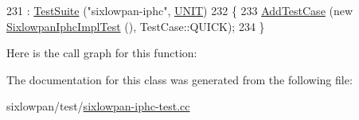 \begin{DoxyCode}
231   : \hyperlink{classns3_1_1TestSuite_a904b0c40583b744d30908aeb94636d1a}{TestSuite} (\textcolor{stringliteral}{"sixlowpan-iphc"}, \hyperlink{classns3_1_1TestSuite_a1ebfcab34ec8161e085e8e3a1855eae0a3885375a3787abf60431f8454b3cadbd}{UNIT})
232 \{
233   \hyperlink{classns3_1_1TestCase_a3718088e3eefd5d6454569d2e0ddd835}{AddTestCase} (\textcolor{keyword}{new} \hyperlink{classSixlowpanIphcImplTest}{SixlowpanIphcImplTest} (), TestCase::QUICK);
234 \}
\end{DoxyCode}


Here is the call graph for this function\+:




The documentation for this class was generated from the following file\+:\begin{DoxyCompactItemize}
\item 
sixlowpan/test/\hyperlink{sixlowpan-iphc-test_8cc}{sixlowpan-\/iphc-\/test.\+cc}\end{DoxyCompactItemize}
